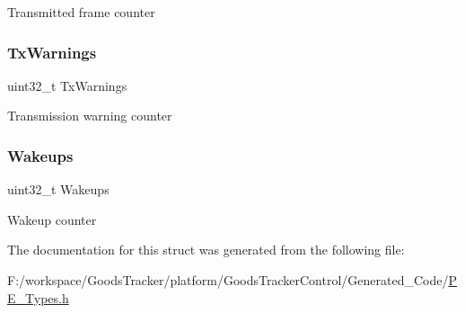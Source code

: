 Transmitted frame counter \mbox{\label{struct_l_d_d___c_a_n___t_stats_a82fcd10253fc36337ac710b9f4208334}} 
\subsubsection{\texorpdfstring{Tx\+Warnings}{TxWarnings}}
{\footnotesize\ttfamily uint32\+\_\+t Tx\+Warnings}

Transmission warning counter \mbox{\label{struct_l_d_d___c_a_n___t_stats_a95c92b6defeef29f43301d87e7323eb5}} 
\subsubsection{\texorpdfstring{Wakeups}{Wakeups}}
{\footnotesize\ttfamily uint32\+\_\+t Wakeups}

Wakeup counter 

The documentation for this struct was generated from the following file\+:\begin{DoxyCompactItemize}
\item 
F\+:/workspace/\+Goods\+Tracker/platform/\+Goods\+Tracker\+Control/\+Generated\+\_\+\+Code/\hyperlink{_p_e___types_8h}{P\+E\+\_\+\+Types.\+h}\end{DoxyCompactItemize}
